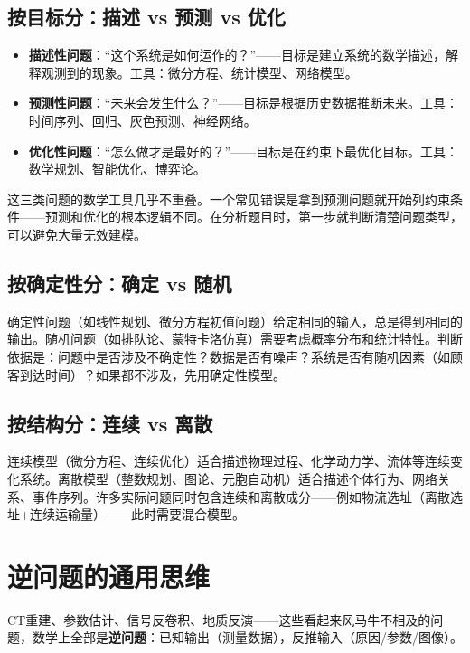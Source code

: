 \documentclass[12pt,a4paper]{ctexart}
\begin{document}
\subsection{按目标分：描述 vs 预测 vs 优化}

\begin{itemize}[nosep]
    \item \textbf{描述性问题}：``这个系统是如何运作的？''——目标是建立系统的数学描述，解释观测到的现象。工具：微分方程、统计模型、网络模型。
    \item \textbf{预测性问题}：``未来会发生什么？''——目标是根据历史数据推断未来。工具：时间序列、回归、灰色预测、神经网络。
    \item \textbf{优化性问题}：``怎么做才是最好的？''——目标是在约束下最优化目标。工具：数学规划、智能优化、博弈论。
\end{itemize}

这三类问题的数学工具几乎不重叠。一个常见错误是拿到预测问题就开始列约束条件——预测和优化的根本逻辑不同。在分析题目时，第一步就判断清楚问题类型，可以避免大量无效建模。

\subsection{按确定性分：确定 vs 随机}

确定性问题（如线性规划、微分方程初值问题）给定相同的输入，总是得到相同的输出。随机问题（如排队论、蒙特卡洛仿真）需要考虑概率分布和统计特性。判断依据是：问题中是否涉及不确定性？数据是否有噪声？系统是否有随机因素（如顾客到达时间）？如果都不涉及，先用确定性模型。

\subsection{按结构分：连续 vs 离散}

连续模型（微分方程、连续优化）适合描述物理过程、化学动力学、流体等连续变化系统。离散模型（整数规划、图论、元胞自动机）适合描述个体行为、网络关系、事件序列。许多实际问题同时包含连续和离散成分——例如物流选址（离散选址+连续运输量）——此时需要混合模型。

\section{逆问题的通用思维}

CT重建、参数估计、信号反卷积、地质反演——这些看起来风马牛不相及的问题，数学上全部是\textbf{逆问题}：已知输出（测量数据），反推输入（原因/参数/图像）。
\end{document}
